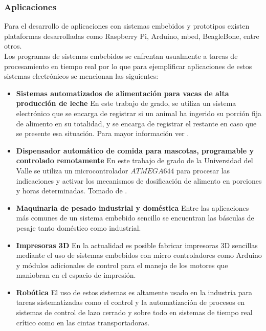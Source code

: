 
\subsubsection{Aplicaciones}

Para el desarrollo de aplicaciones con sistemas embebidos y prototipos existen plataformas desarrolladas como Raspberry Pi, Arduino, mbed, BeagleBone, entre otros.\\

Los programas de sistemas embebidos se enfrentan usualmente a tareas de procesamiento en tiempo real por lo que para ejemplificar aplicaciones de estos sistemas electrónicos se mencionan las siguientes:

\begin{itemize}
    \item  \textbf{Sistemas automatizados de alimentación para vacas de alta producción de leche}
    En este trabajo de grado, se utiliza un sistema electrónico que se encarga de registrar si un animal ha ingerido su porción fija de alimento en su totalidad, y se encarga de registrar  el restante en caso que se presente esa situación. Para mayor información ver \cite{aguero}.  
    \item  \textbf{Dispensador automático de comida para mascotas, programable y controlado remotamente}
    En este trabajo de grado de la Universidad del Valle se utiliza un microcontrolador $ATMEGA644$ para procesar las indicaciones  y activar los mecanismos de dosificación de alimento en porciones y horas determinadas. Tomado de \cite{univalle}.\\
    \item  \textbf{Maquinaria de pesado industrial y doméstica} 
    Entre las aplicaciones más comunes de un sistema embebido sencillo se encuentran las básculas de pesaje tanto doméstico como industrial.
    \item  \textbf{Impresoras 3D}
    En la actualidad es posible fabricar impresoras 3D sencillas mediante el uso de sistemas embebidos con micro controladores como Arduino y módulos adicionales de control para el manejo de los motores que maniobran en el espacio de impresión.
    \item  \textbf{Robótica}
    El uso de estos sistemas es altamente usado en la industria para tareas sistematizadas como el control y la automatización de procesos en sistemas de control de lazo cerrado y sobre todo en sistemas de tiempo real crítico como en las cintas transportadoras.
\end{itemize}


